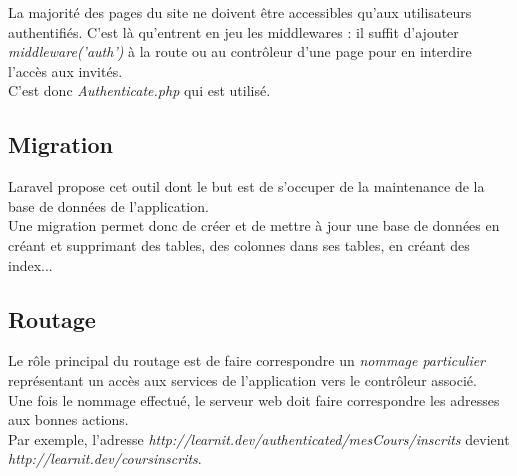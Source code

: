 La majorité des pages du site ne doivent être accessibles qu'aux utilisateurs authentifiés.
C'est là qu'entrent en jeu les middlewares : il suffit d'ajouter \textit{middleware('auth')} à la route ou au contrôleur d'une page pour en interdire l'accès aux invités. \\
C'est donc \textit{Authenticate.php} qui est utilisé.


\subsection{Migration}
\label{subsec:migration}
Laravel propose cet outil dont le but est de s'occuper de la maintenance de la base de données de l'application.\\
Une migration permet donc de créer et de mettre à jour une base de données en créant et supprimant des tables, des colonnes dans ses tables, en créant des index...

\newpage
\subsection{Routage}
\label{subsec:routage}
Le rôle principal du routage est de faire correspondre un \textit{nommage particulier} représentant un accès aux services de l'application vers le contrôleur associé.\\
Une fois le nommage effectué, le serveur web doit faire correspondre les adresses aux bonnes actions.\\
Par exemple, l'adresse \textit{http://learnit.dev/authenticated/mesCours/inscrits}
devient \textit{http://learnit.dev/coursinscrits}.

